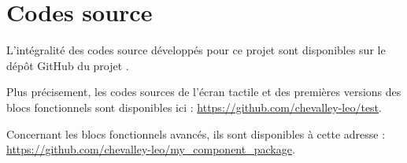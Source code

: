 \chapter{Codes source}
\label{chap:codes}

L'intégralité des codes source développés pour ce projet sont disponibles sur le dépôt GitHub du projet \cite{GitHubRepo}.

Plus précisement, les codes sources de l'écran tactile et des premières versions des blocs fonctionnels sont disponibles ici : \url{https://github.com/chevalley-leo/test}.

Concernant les blocs fonctionnels avancés, ils sont disponibles à cette adresse : \url{https://github.com/chevalley-leo/my_component_package}.